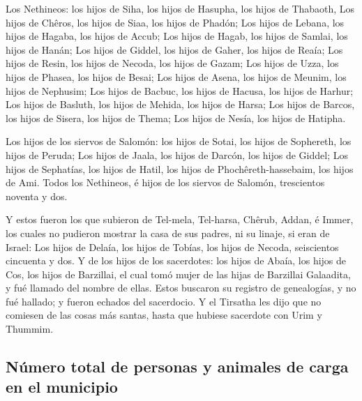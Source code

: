 Los Nethineos: los hijos de Siha, los hijos de Hasupha,
los hijos de Thabaoth,  Los hijos de Chêros, los hijos de
Siaa, los hijos de Phadón;  Los hijos de Lebana, los
hijos de Hagaba, los hijos de Accub;  Los hijos de Hagab,
los hijos de Samlai, los hijos de Hanán;  Los hijos de
Giddel, los hijos de Gaher, los hijos de Reaía;  Los
hijos de Resin, los hijos de Necoda, los hijos de Gazam; 
Los hijos de Uzza, los hijos de Phasea, los hijos de Besai;
 Los hijos de Asena, los hijos de Meunim, los hijos de
Nephusim;  Los hijos de Bacbuc, los hijos de Hacusa, los
hijos de Harhur;  Los hijos de Basluth, los hijos de
Mehida, los hijos de Harsa;  Los hijos de Barcos, los
hijos de Sisera, los hijos de Thema;  Los hijos de Nesía,
los hijos de Hatipha.

 Los hijos de los siervos de Salomón: los hijos de Sotai,
los hijos de Sophereth, los hijos de Peruda;  Los hijos
de Jaala, los hijos de Darcón, los hijos de Giddel;  Los
hijos de Sephatías, los hijos de Hatil, los hijos de
Phochêreth-hassebaim, los hijos de Ami.  Todos los
Nethineos, é hijos de los siervos de Salomón, trescientos noventa y dos.

 Y estos fueron los que subieron de Tel-mela, Tel-harsa,
Chêrub, Addan, é Immer, los cuales no pudieron mostrar la casa de sus
padres, ni su linaje, si eran de Israel:  Los hijos de
Delaía, los hijos de Tobías, los hijos de Necoda, seiscientos cincuenta
y dos.  Y de los hijos de los sacerdotes: los hijos de
Abaía, los hijos de Cos, los hijos de Barzillai, el cual tomó mujer de
las hijas de Barzillai Galaadita, y fué llamado del nombre de ellas.
 Estos buscaron su registro de genealogías, y no fué
hallado; y fueron echados del sacerdocio.  Y el Tirsatha
les dijo que no comiesen de las cosas más santas, hasta que hubiese
sacerdote con Urim y Thummim.

\hypertarget{nuxfamero-total-de-personas-y-animales-de-carga-en-el-municipio}{%
\subsection{Número total de personas y animales de carga en el
municipio}\label{nuxfamero-total-de-personas-y-animales-de-carga-en-el-municipio}}

